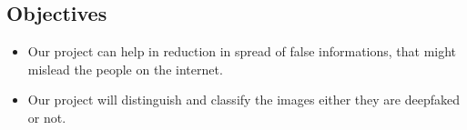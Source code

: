 \subsection{Objectives}
\justify
\begin{itemize}
    \item Our project can help in  reduction in spread of false informations, that might mislead the people on the internet.
    \item Our project will distinguish and classify the images either they are deepfaked or not.
\end{itemize}
